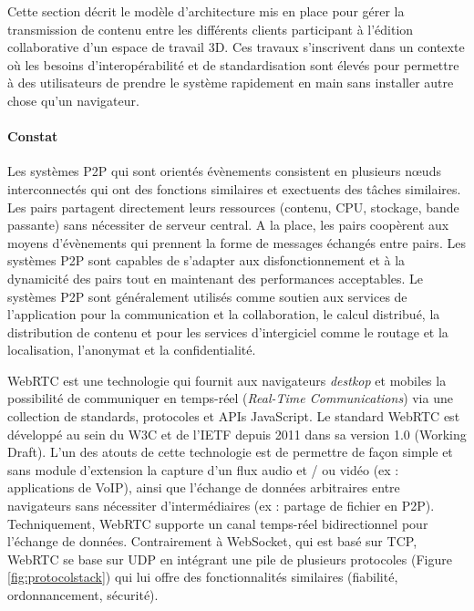 Cette section décrit le modèle d'architecture mis en 
place pour gérer la transmission de contenu entre les différents clients 
participant à l'édition collaborative d'un espace de travail 3D. 
Ces travaux s'inscrivent dans un contexte où les besoins d'interopérabilité 
et de standardisation sont élevés pour permettre à des utilisateurs de 
prendre le système rapidement en main sans installer autre chose qu'un 
navigateur. 

\paragraph{Constat}

Les systèmes P2P qui sont orientés évènements consistent en plusieurs n\oe uds 
interconnectés qui ont des fonctions similaires et exectuents des tâches 
similaires. Les pairs partagent directement leurs ressources (contenu, CPU, 
stockage, bande passante) sans nécessiter de serveur central. A la place, les 
pairs coopèrent aux moyens d'évènements qui prennent la forme de messages 
échangés entre pairs. Les systèmes P2P sont capables de s'adapter aux 
disfonctionnement et à la dynamicité des pairs tout en maintenant des 
performances acceptables. Le systèmes P2P sont généralement utilisés comme 
soutien aux services de l'application pour la communication et la collaboration, le 
calcul distribué, la distribution de contenu et pour les services d'intergiciel comme 
le routage et la localisation, l'anonymat et la confidentialité.

\gls{WebRTC} est une technologie qui fournit aux navigateurs 
\textit{destkop} et mobiles la possibilité de communiquer en temps-réel 
(\textit{Real-Time Communications}) via une collection de standards, 
protocoles et \glspl{API} JavaScript. 
Le standard \gls{WebRTC} est développé au sein du \gls{W3C} et de 
l'\gls{IETF} depuis 2011 dans sa version 1.0 (Working Draft). 
L'un des atouts de cette technologie est de permettre de façon simple et 
sans module d'extension la capture d'un flux audio et / ou vidéo (ex : 
applications de VoIP), ainsi que l'échange de données arbitraires entre 
navigateurs sans nécessiter d'intermédiaires (ex : partage de fichier en 
P2P).
Techniquement, \gls{WebRTC} supporte un canal temps-réel 
bidirectionnel pour l'échange de données. Contrairement à 
\gls{WebSocket}, qui est basé sur \gls{TCP}, \gls{WebRTC} se base sur 
\acrshort{UDP} en intégrant une pile de plusieurs protocoles (Figure 
\ref{fig:protocolstack}) qui lui offre des fonctionnalités similaires (fiabilité, 
ordonnancement, sécurité). 


